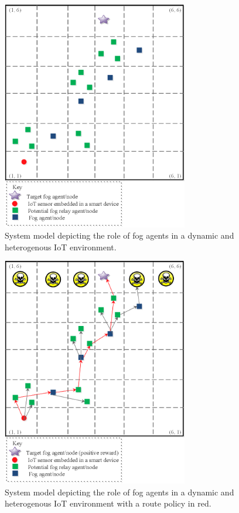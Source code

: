 \documentclass[journal]{IEEEtran}
\begin{document}
\begin{figure}[!t]
\centering
\includegraphics[width=3.2in]{fogmodel.eps}
\caption{System model depicting the role of fog agents in a dynamic and heterogenous IoT environment.}
\label{fogmodel}
\end{figure}

\begin{figure}[!t]
\centering
\includegraphics[width=3.2in]{fogmodel2.eps}
\caption{System model depicting the role of fog agents in a dynamic and heterogenous IoT environment with a route policy in red.}
\label{fogmodel2}
\end{figure}
\end{document}
